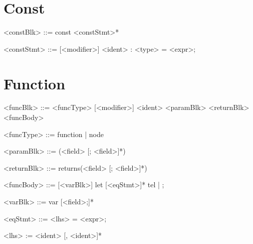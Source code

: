\documentclass{article}
\begin{document}
\section{Const}
\begin{grammar}

<constBlk> ::= const <constStmt>*

<constStmt> ::= [<modifier>] <ident> : <type> = <expr>;


\end{grammar}

\section{Function}
\begin{grammar}

<funcBlk> ::= <funcType> [<modifier>] <ident> <paramBlk> <returnBlk> <funcBody>

<funcType> ::= function | node

<paramBlk> ::= (<field> [; <field>]*)

<returnBlk> ::= returns(<field> [; <field>]*)

<funcBody> ::= [<varBlk>] let [<eqStmt>]* tel | ;

<varBlk> ::= var [<field>;]*

<eqStmt> ::= <lhs> = <expr>;

<lhs> := <ident> [, <ident>]*

\end{grammar}
\end{document}
